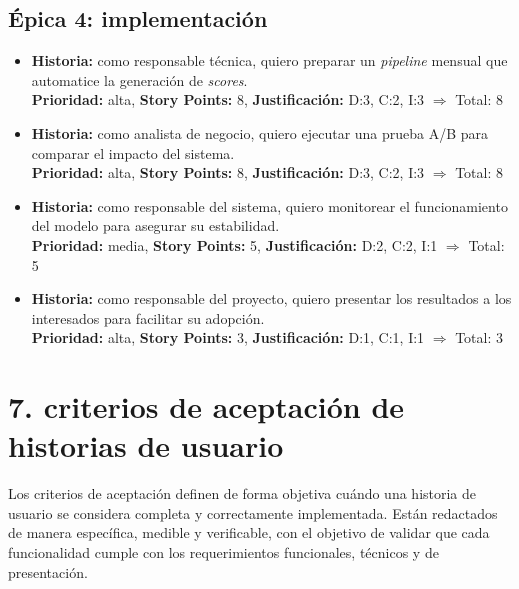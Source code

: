 \documentclass[
11pt, %
]{charter}
\begin{document}
\subsection*{\'Epica 4: implementación}
\begin{itemize}
  \item \textbf{Historia:} como responsable técnica, quiero preparar un \textit{pipeline} mensual que automatice la generación de \textit{scores}.\\
  \textbf{Prioridad:} alta, \textbf{Story Points:} 8, \textbf{Justificación:} D:3, C:2, I:3 $\Rightarrow$ Total: 8

  \item \textbf{Historia:} como analista de negocio, quiero ejecutar una prueba A/B para comparar el impacto del sistema.\\
  \textbf{Prioridad:} alta, \textbf{Story Points:} 8, \textbf{Justificación:} D:3, C:2, I:3 $\Rightarrow$ Total: 8

  \item \textbf{Historia:} como responsable del sistema, quiero monitorear el funcionamiento del modelo para asegurar su estabilidad.\\
  \textbf{Prioridad:} media, \textbf{Story Points:} 5, \textbf{Justificación:} D:2, C:2, I:1 $\Rightarrow$ Total: 5

  \item \textbf{Historia:} como responsable del proyecto, quiero presentar los resultados a los interesados para facilitar su adopción.\\
  \textbf{Prioridad:} alta, \textbf{Story Points:} 3, \textbf{Justificación:} D:1, C:1, I:1 $\Rightarrow$ Total: 3
\end{itemize}

\section{7. criterios de aceptación de historias de usuario}
\label{sec:criteriosAceptacion}

Los criterios de aceptación definen de forma objetiva cuándo una historia de usuario se considera completa y correctamente implementada. Están redactados de manera específica, medible y verificable, con el objetivo de validar que cada funcionalidad cumple con los requerimientos funcionales, técnicos y de presentación.
\end{document}
